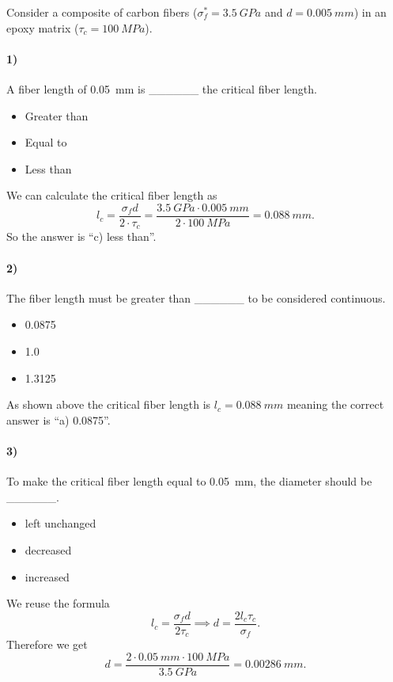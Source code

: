 
Consider a composite of carbon fibers ($\sigma_{f}^{*} = \qty{3,5}{GPa}$ and $d = \qty{0,005}{mm}$) in an epoxy matrix ($\tau_c = \qty{100}{MPa}$). 

\paragraph{1)} A fiber length of \qty{0,05}{mm} is \_\_\_\_\_\_ the critical fiber length.
\begin{itemize}
  \item Greater than
  \item Equal to
  \item Less than
\end{itemize}
\bigbreak
We can calculate the critical fiber length as
\[ 
l_c = \frac{\sigma_f d}{2 \cdot \tau_c} = \frac{\qty{3,5}{GPa} \cdot \qty{0,005}{mm}}{2 \cdot \qty{100}{MPa} } = \qty{0,088}{mm} 
.\]
So the answer is ``c) less than''.


\paragraph{2)} The fiber length must be greater than \_\_\_\_\_\_ to be considered continuous.
\begin{itemize}
  \item \num{0,0875} 
  \item \num{1,0} 
  \item \num{1,3125}
\end{itemize}
\bigbreak
As shown above the critical fiber length is $l_c = \qty{0,088}{mm}$ meaning the correct answer is ``a) \num{0,0875}''.


\paragraph{3)} To make the critical fiber length equal to \qty{0,05}{mm}, the diameter should be \_\_\_\_\_\_.
\begin{itemize}
  \item left unchanged
  \item decreased
  \item increased
\end{itemize}
\bigbreak
We reuse the formula
\[ 
l_c = \frac{\sigma_f d}{2 \tau_c} \implies d = \frac{2 l_c \tau_c}{\sigma_f}
.\]
Therefore we get
\[ 
d = \frac{2 \cdot \qty{0,05}{mm} \cdot \qty{100}{MPa}}{\qty{3,5}{GPa}} = \qty{0,00286}{mm}
.\]



